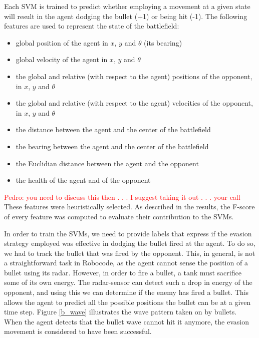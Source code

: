 \documentclass{article}
\newcommand{\xxx}[1]{\textcolor{red}{#1}}
\theoremstyle{plain}
\theoremstyle{definition}
\theoremstyle{remark}
\begin{document}
Each SVM is trained to predict whether employing a movement at a given state will result in the agent dodging the bullet (+1) or being hit
(-1). The following features are used to represent the state of the battlefield:

\begin{itemize}
	\item global position of the agent in $x$, $y$ and $\theta$ (its bearing)
	\item global velocity of the agent in $x$, $y$ and $\theta$
	\item the global and relative (with respect to the agent) positions of the opponent, in $x$, $y$ and $\theta$
	\item the global and relative (with respect to the agent) velocities of the opponent, in $x$, $y$ and $\theta$
	\item the distance between the agent and the center of the battlefield
	\item the bearing between the agent and the center of the battlefield
	\item the Euclidian distance between the agent and the opponent
	\item the health of the agent and of the opponent
\end{itemize}

\xxx{Pedro: you need to discuss this then . . . I suggest taking it out . . . your call}\\
These features were heuristically selected. As described in the results, the F-score of every feature was computed to evaluate their contribution to the SVMs.

In order to train the SVMs, we need to provide labels that express if the evasion strategy employed was effective in dodging the bullet fired at the agent. To do so, we had to track the bullet that was fired by the opponent. This, in general, is not a straightforward task in Robocode, as the agent cannot sense the position of a bullet using its radar. However, in order to fire a bullet, a tank must sacrifice some of its own energy. The radar-sensor can detect such a drop in energy of the opponent, and using this we can determine if the enemy has fired a bullet. This allows the agent to predict all the possible positions the bullet can be at a given time step.
Figure \ref{b_wave} illustrates the wave pattern taken on by bullets. When the agent detects that the bullet wave cannot hit it anymore, the evasion movement is considered to have been successful. 
\end{document}
